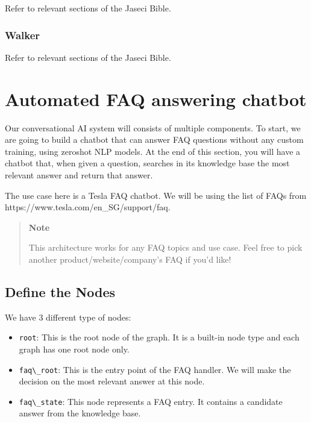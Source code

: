 Refer to relevant sections of the Jaseci Bible.

\hypertarget{walker}{%
\subsubsection{Walker}\label{walker}}

Refer to relevant sections of the Jaseci Bible.

\hypertarget{automated-faq-answering-chatbot}{%
\section{Automated FAQ answering
chatbot}\label{automated-faq-answering-chatbot}}

Our conversational AI system will consists of multiple components. To
start, we are going to build a chatbot that can answer FAQ questions
without any custom training, using zeroshot NLP models. At the end of
this section, you will have a chatbot that, when given a question,
searches in its knowledge base the most relevant answer and return that
answer.

The use case here is a Tesla FAQ chatbot. We will be using the list of
FAQs from https://www.tesla.com/en\_SG/support/faq.

\begin{quote}
\textbf{Note}

This architecture works for any FAQ topics and use case. Feel free to
pick another product/website/company's FAQ if you'd like!
\end{quote}

\hypertarget{define-the-nodes}{%
\subsection{Define the Nodes}\label{define-the-nodes}}

We have 3 different type of nodes:

\begin{itemize}
\tightlist
\item
  \passthrough{\lstinline!root!}: This is the root node of the graph. It
  is a built-in node type and each graph has one root node only.
\item
  \passthrough{\lstinline!faq\_root!}: This is the entry point of the
  FAQ handler. We will make the decision on the most relevant answer at
  this node.
\item
  \passthrough{\lstinline!faq\_state!}: This node represents a FAQ
  entry. It contains a candidate answer from the knowledge base.
\end{itemize}

